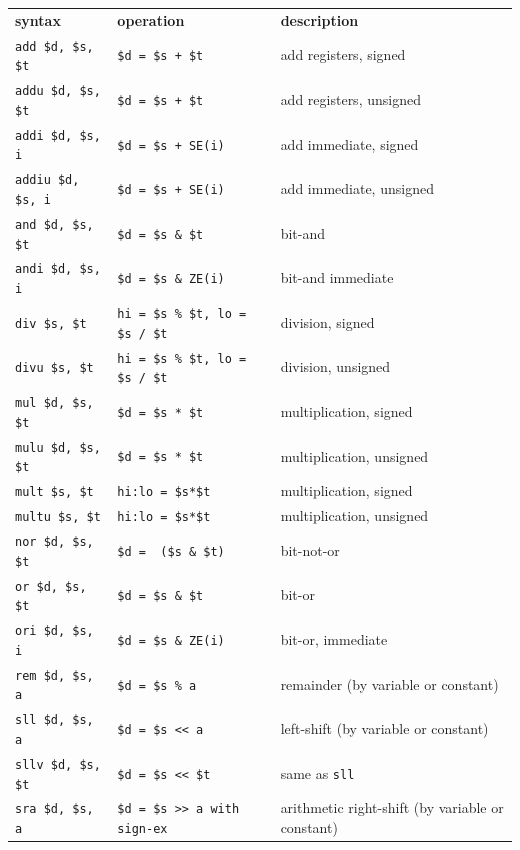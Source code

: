 \documentclass[12pt]{article}
\begin{document}
\begin{longtable}{l || l | l}
    \textbf{syntax} & \textbf{operation} & \textbf{description}\\
    \hhline{=#=|=}
    \texttt{add   \$d, \$s, \$t} & \texttt{\$d = \$s + \$t} & add registers, signed\\ \hline
    \texttt{addu  \$d, \$s, \$t} & \texttt{\$d = \$s + \$t} & add registers, unsigned\\ \hline
    \texttt{addi  \$d, \$s, i} & \texttt{\$d = \$s + SE(i)} & add immediate, signed\\ \hline
    \texttt{addiu \$d, \$s, i} & \texttt{\$d = \$s + SE(i)} & add immediate, unsigned\\ \hline
    \texttt{and   \$d, \$s, \$t} & \texttt{\$d = \$s \& \$t} & bit-and\\ \hline
    \texttt{andi  \$d, \$s, i} & \texttt{\$d = \$s \& ZE(i)} & bit-and immediate\\ \hline
    \texttt{div   \$s, \$t} & \texttt{hi = \$s \% \$t, lo = \$s / \$t} & division, signed\\ \hline
    \texttt{divu  \$s, \$t} & \texttt{hi = \$s \% \$t, lo = \$s / \$t} & division, unsigned\\ \hline
    \texttt{mul   \$d, \$s, \$t} & \texttt{\$d = \$s * \$t} & multiplication, signed\\ \hline
    \texttt{mulu  \$d, \$s, \$t} & \texttt{\$d = \$s * \$t} & multiplication, unsigned\\ \hline
    \texttt{mult  \$s, \$t} & \texttt{hi:lo = \$s*\$t} & multiplication, signed\\ \hline
    \texttt{multu \$s, \$t} & \texttt{hi:lo = \$s*\$t} & multiplication, unsigned\\ \hline
    \texttt{nor   \$d, \$s, \$t} & \texttt{\$d = ~(\$s \& \$t)} & bit-not-or\\ \hline
    \texttt{or    \$d, \$s, \$t} & \texttt{\$d = \$s \& \$t} & bit-or\\ \hline
    \texttt{ori   \$d, \$s, i} & \texttt{\$d = \$s \& ZE(i)} & bit-or, immediate\\ \hline
    \texttt{rem   \$d, \$s, a} & \texttt{\$d = \$s \% a} & remainder (by variable or constant)\\ \hline
    \texttt{sll   \$d, \$s, a} & \texttt{\$d = \$s << a} & left-shift (by variable or constant)\\ \hline
    \texttt{sllv  \$d, \$s, \$t} & \texttt{\$d = \$s << \$t} & same as \texttt{sll}\\ \hline
    \texttt{sra   \$d, \$s, a} & \texttt{\$d = \$s >> a  with sign-ex} & arithmetic right-shift (by variable or constant)\\ \hline

\end{longtable}
\end{document}

